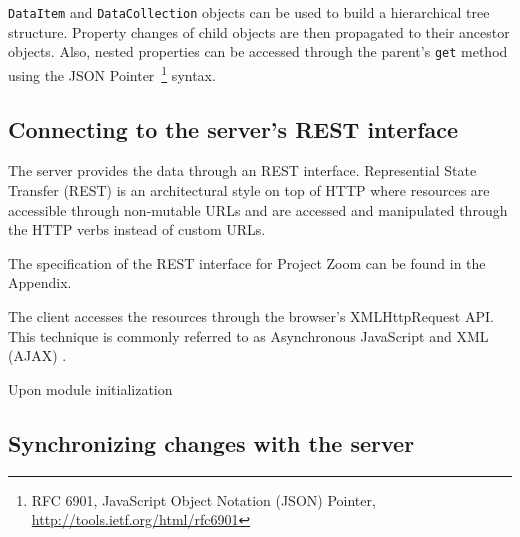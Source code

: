 \texttt{DataItem} and \texttt{DataCollection} objects can be used to build a hierarchical tree structure. Property changes of child objects are then propagated to their ancestor objects. Also, nested properties can be accessed through the parent's \texttt{get} method using the JSON Pointer \footnote{RFC 6901, JavaScript Object Notation (JSON) Pointer, \url{http://tools.ietf.org/html/rfc6901}} syntax.


\subsection{Connecting to the server's REST interface}
The server provides the data through an REST interface. Represential State Transfer (REST) is an architectural style on top of HTTP where resources are accessible through non-mutable URLs and are accessed and manipulated through the HTTP verbs instead of custom URLs. \cite{Fielding_2000} 

The specification of the REST interface for Project Zoom can be found in the Appendix. 

The client accesses the resources through the browser's XMLHttpRequest \cite{W3C_XHR} API. This technique is commonly referred to as Asynchronous JavaScript and XML (AJAX) \cite{Garrett_2005}. 

Upon module initialization 

\subsection{Synchronizing changes with the server}

